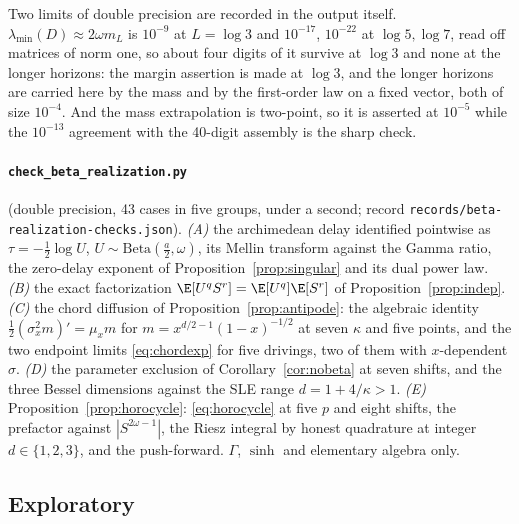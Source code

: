Two limits of double precision are recorded in the output itself.
$\lambda_{\min}(D)\approx2\omega m_L$ is $10^{-9}$ at $L=\log3$ and $10^{-17}$,
$10^{-22}$ at $\log5,\log7$, read off matrices of norm one, so about four digits
of it survive at $\log3$ and none at the longer horizons: the margin assertion
is made at $\log3$, and the longer horizons are carried here by the mass and by
the first-order law on a fixed vector, both of size $10^{-4}$. And the mass
extrapolation is two-point, so it is asserted at $10^{-5}$ while the $10^{-13}$
agreement with the 40-digit assembly is the sharp check.

\paragraph{\texttt{check\_beta\_realization.py}} (double precision, 43 cases in
five groups, under a second; record
\texttt{records/beta-\allowbreak realization-\allowbreak checks.json}). \emph{(A)} the archimedean delay
identified pointwise as $\tau=-\frac12\log U$, $U\sim\mathrm{Beta}(\frac a2,\omega)$,
its Mellin transform against the Gamma ratio, the zero-delay exponent of
Proposition~\ref{prop:singular} and its dual power law. \emph{(B)} the exact
factorization $\E[U^qS^r]=\E[U^q]\E[S^r]$ of Proposition~\ref{prop:indep}.
\emph{(C)} the chord diffusion of Proposition~\ref{prop:antipode}: the algebraic
identity $\frac12(\sigma_x^2m)'=\mu_xm$ for $m=x^{d/2-1}(1-x)^{-1/2}$ at seven
$\kappa$ and five points, and the two endpoint limits \eqref{eq:chordexp} for
five drivings, two of them with $x$-dependent $\sigma$. \emph{(D)} the parameter
exclusion of Corollary~\ref{cor:nobeta} at seven shifts, and the three Bessel
dimensions against the SLE range $d=1+4/\kappa>1$. \emph{(E)}
Proposition~\ref{prop:horocycle}: \eqref{eq:horocycle} at five $p$ and eight
shifts, the prefactor against $|S^{2\omega-1}|$, the Riesz integral by honest
quadrature at integer $d\in\{1,2,3\}$, and the push-forward. $\Gamma$, $\sinh$
and elementary algebra only.

\subsection*{Exploratory}

